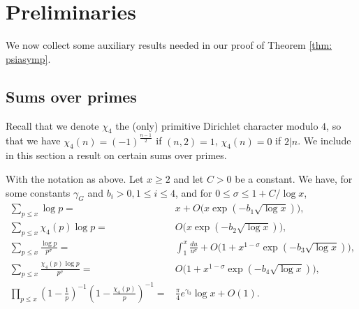 \documentclass[twoside,leqno,10pt, A4]{amsart}
\begin{document}
  
  


\section{Preliminaries}
\label{sec 2}


  We now collect some auxiliary results needed in our proof of Theorem \ref{thm: psiasymp}.

\subsection{Sums over primes}
\label{sec:sum primes}

   Recall that we denote $\chi_4$ the (only) primitive Dirichlet character modulo $4$, so that we have $\chi_4(n) =(-1)^{\frac {n-1}2}$ if $(n,2)=1$, $\chi_4(n)=0$ if $2|n$. 
    We include in this section a result on certain sums over primes.
\begin{lemma}
\label{RS}
 With the notation as above. Let $x \geq 2$ and let $C>0$ be a constant. We have, for some constants $\gamma_G$ and $b_i>0, 1 \leq i \leq 4$, and for $0 \leq \sigma \leq 1+C/\log x$, 
\begin{align}
\label{merten2-0}
\sum_{p\le x} \log p =& 
  x+O\Big(x \exp(-b_1\sqrt{\log x})\Big), \\
\label{merten2}
\sum_{p\le x} \chi_4(p)\log p =&  
  O\Big(x \exp(-b_2\sqrt{\log x})\Big),  \\
\label{sumpsigmalogp}
\sum_{p\le x} \frac{\log p}{p^{\sigma}} =& \int^{x}_1\frac {du}{u^{\sigma}}+ O\Big(1+x^{1-\sigma}\exp(-b_3\sqrt{\log x})\Big), \\
\label{sumpsigmalogpchi}
\sum_{p\le x} \frac{\chi_4(p)\log p}{p^{\sigma}} =& O\Big(1+x^{1-\sigma}\exp(-b_4\sqrt{\log x})\Big), \\
\label{merten4}
 \prod_{p\le x}(1-\frac {1}{p})^{-1}(1-\frac {\chi_4(p)}{p})^{-1}=& \frac {\pi}{4}e^{\gamma_0}\log x+O(1).
\end{align}
\end{lemma}
\end{document}
